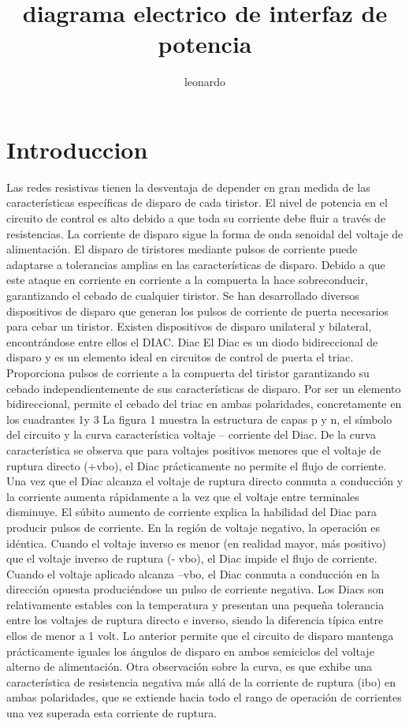 \documentclass[12pt,a4paper]{article}
\author{leonardo}
\title{diagrama electrico de interfaz de potencia }
\begin{document}
\section{Introduccion}
\begin{flushleft}
Las redes resistivas tienen la desventaja de depender en gran medida de las características específicas de
disparo de cada tiristor.
El nivel de potencia en el circuito de control es alto debido a que toda su corriente debe fluir a través de
resistencias.
La corriente de disparo sigue la forma de onda senoidal del voltaje de alimentación.
El disparo de tiristores mediante pulsos de corriente puede adaptarse a tolerancias
amplias en las características de disparo.
Debido a que este ataque en corriente en corriente a la compuerta la hace sobreconducir, garantizando el
cebado de cualquier tiristor.
Se han desarrollado diversos dispositivos de disparo que generan los pulsos de corriente de puerta
necesarios para cebar un tiristor.
Existen dispositivos de disparo unilateral y bilateral, encontrándose entre ellos el DIAC.
Diac
El Diac es un diodo bidireccional de disparo y es un elemento ideal en circuitos de control de puerta el
triac.
Proporciona pulsos de corriente a la compuerta del tiristor garantizando su cebado independientemente de
sus características de disparo.
Por ser un elemento bidireccional, permite el cebado del triac en ambas polaridades, concretamente en los
cuadrantes 1y 3 La figura 1 muestra la estructura de capas p y n, el símbolo del circuito y la curva
característica voltaje – corriente del Diac.
De la curva característica se observa que para voltajes positivos menores que el voltaje de ruptura directo
(+vbo), el Diac prácticamente no permite el flujo de corriente.
Una vez que el Diac alcanza el voltaje de ruptura directo conmuta a conducción y la corriente aumenta
rápidamente a la vez que el voltaje entre terminales disminuye.
El súbito aumento de corriente explica la habilidad del Diac para producir pulsos de corriente.
En la región de voltaje negativo, la operación es idéntica.
Cuando el voltaje inverso es menor (en realidad mayor, más positivo) que el voltaje inverso de ruptura (-
vbo), el Diac impide el flujo de corriente.
Cuando el voltaje aplicado alcanza –vbo, el Diac conmuta a conducción en la dirección opuesta
produciéndose un pulso de corriente negativa.
Los Diacs son relativamente estables con la temperatura y presentan una pequeña tolerancia entre los
voltajes de ruptura directo e inverso, siendo la diferencia típica entre ellos de menor a 1 volt.
Lo anterior permite que el circuito de disparo mantenga prácticamente iguales los ángulos de disparo en
ambos semiciclos del voltaje alterno de alimentación.
Otra observación sobre la curva, es que exhibe una característica de resistencia negativa más allá de la
corriente de ruptura (ibo) en ambas polaridades, que se extiende hacia todo el rango de operación de
corrientes una vez superada esta corriente de ruptura.
\end{flushleft}
\end{document}

